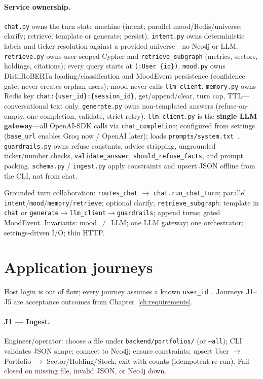 \paragraph{Service ownership.}
\texttt{chat.py} owns the turn state machine (intent; parallel mood/Redis/universe; clarify; retrieve; template or generate; persist). \texttt{intent.py} owns deterministic labels and ticker resolution against a provided universe---no Neo4j or LLM. \texttt{retrieve.py} owns user-scoped Cypher and \texttt{retrieve\_subgraph} (metrics, sectors, holdings, citations); every query starts at \texttt{(:User \{id\})}. \texttt{mood.py} owns DistilRoBERTa loading/classification and MoodEvent persistence (confidence gate; never creates orphan users); mood never calls \texttt{llm\_client}. \texttt{memory.py} owns Redis key \texttt{chat:\{user\_id\}:\{session\_id\}}, get/append/clear, turn cap, TTL---conversational text only. \texttt{generate.py} owns non-templated answers (refuse-on-empty, one completion, validate, strict retry). \texttt{llm\_client.py} is the \textbf{single LLM gateway}---all OpenAI-SDK calls via \texttt{chat\_completion}; configured from settings (\texttt{base\_url} enables Groq now / OpenAI later); loads \texttt{prompts/system.txt}~\cite{trd}. \texttt{guardrails.py} owns refuse constants, advice stripping, ungrounded ticker/number checks, \texttt{validate\_answer}, \texttt{should\_refuse\_facts}, and prompt packing. \texttt{schema.py} / \texttt{ingest.py} apply constraints and upsert JSON offline from the CLI, not from chat.

\noindent
Grounded turn collaboration: \texttt{routes\_chat} $\rightarrow$ \texttt{chat.run\_chat\_turn}; parallel \texttt{intent}/\texttt{mood}/\texttt{memory}/\texttt{retrieve}; optional clarify; \texttt{retrieve\_subgraph}; template in \texttt{chat} or \texttt{generate}$\rightarrow$\texttt{llm\_client}$\rightarrow$\texttt{guardrails}; append turns; gated MoodEvent. Invariants: mood $\neq$ LLM; one LLM gateway; one orchestrator; settings-driven I/O; thin HTTP.

\section{Application journeys}

Host login is out of flow; every journey assumes a known \texttt{user\_id}~\cite{prd}. Journeys J1--J5 are acceptance outcomes from Chapter~\ref{ch:requirements}.

\paragraph{J1 --- Ingest.}
Engineer/operator: choose a file under \texttt{backend/portfolios/} (or \texttt{--all}); CLI validates JSON shape; connect to Neo4j; ensure constraints; upsert User $\rightarrow$ Portfolio $\rightarrow$ Sector/Holding/Stock; exit with counts (idempotent re-run). Fail closed on missing file, invalid JSON, or Neo4j down.

